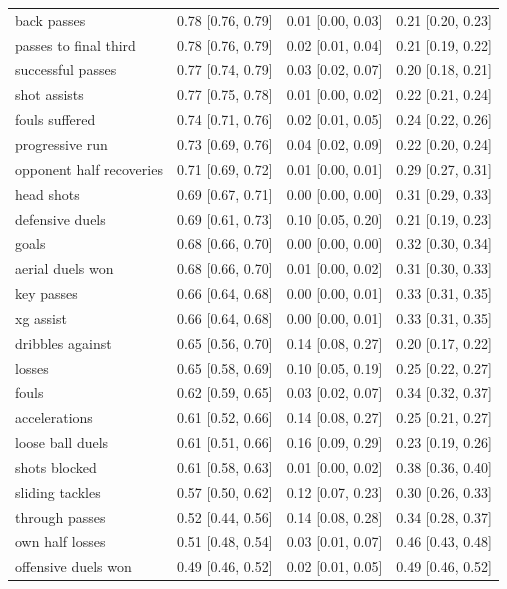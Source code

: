 \begin{longtable}{llll}
back passes & 0.78 [0.76, 0.79] & 0.01 [0.00, 0.03] & 0.21 [0.20, 0.23]\\
passes to final third & 0.78 [0.76, 0.79] & 0.02 [0.01, 0.04] & 0.21 [0.19, 0.22]\\
successful passes & 0.77 [0.74, 0.79] & 0.03 [0.02, 0.07] & 0.20 [0.18, 0.21]\\
shot assists & 0.77 [0.75, 0.78] & 0.01 [0.00, 0.02] & 0.22 [0.21, 0.24]\\
fouls suffered & 0.74 [0.71, 0.76] & 0.02 [0.01, 0.05] & 0.24 [0.22, 0.26]\\
progressive run & 0.73 [0.69, 0.76] & 0.04 [0.02, 0.09] & 0.22 [0.20, 0.24]\\
opponent half recoveries & 0.71 [0.69, 0.72] & 0.01 [0.00, 0.01] & 0.29 [0.27, 0.31]\\
head shots & 0.69 [0.67, 0.71] & 0.00 [0.00, 0.00] & 0.31 [0.29, 0.33]\\
defensive duels & 0.69 [0.61, 0.73] & 0.10 [0.05, 0.20] & 0.21 [0.19, 0.23]\\
goals & 0.68 [0.66, 0.70] & 0.00 [0.00, 0.00] & 0.32 [0.30, 0.34]\\
aerial duels won & 0.68 [0.66, 0.70] & 0.01 [0.00, 0.02] & 0.31 [0.30, 0.33]\\
key passes & 0.66 [0.64, 0.68] & 0.00 [0.00, 0.01] & 0.33 [0.31, 0.35]\\
xg assist & 0.66 [0.64, 0.68] & 0.00 [0.00, 0.01] & 0.33 [0.31, 0.35]\\
dribbles against & 0.65 [0.56, 0.70] & 0.14 [0.08, 0.27] & 0.20 [0.17, 0.22]\\
losses & 0.65 [0.58, 0.69] & 0.10 [0.05, 0.19] & 0.25 [0.22, 0.27]\\
fouls & 0.62 [0.59, 0.65] & 0.03 [0.02, 0.07] & 0.34 [0.32, 0.37]\\
accelerations & 0.61 [0.52, 0.66] & 0.14 [0.08, 0.27] & 0.25 [0.21, 0.27]\\
loose ball duels & 0.61 [0.51, 0.66] & 0.16 [0.09, 0.29] & 0.23 [0.19, 0.26]\\
shots blocked & 0.61 [0.58, 0.63] & 0.01 [0.00, 0.02] & 0.38 [0.36, 0.40]\\
sliding tackles & 0.57 [0.50, 0.62] & 0.12 [0.07, 0.23] & 0.30 [0.26, 0.33]\\
through passes & 0.52 [0.44, 0.56] & 0.14 [0.08, 0.28] & 0.34 [0.28, 0.37]\\
own half losses & 0.51 [0.48, 0.54] & 0.03 [0.01, 0.07] & 0.46 [0.43, 0.48]\\
offensive duels won & 0.49 [0.46, 0.52] & 0.02 [0.01, 0.05] & 0.49 [0.46, 0.52]\\

\end{longtable}
